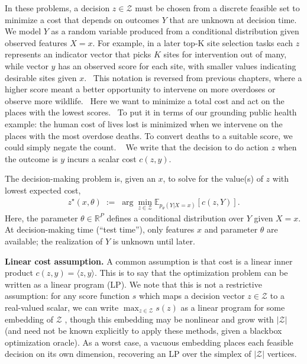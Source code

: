 In these problems, a decision $z\in\mathcal{Z}$ must be chosen from a
discrete feasible set to minimize a cost that depends on outcomes $Y$ that are
unknown at decision time. We model $Y$ as a random variable produced from a
conditional distribution given observed features $X=x$. 
For example, in a later top-K site selection tasks each $z$ represents an indicator vector that picks $K$ sites for intervention out of many, while vector $y$ has an observed score for each site, with smaller values indicating desirable sites given $x$. \
This notation is reversed from previous chapters, where a higher score meant a better opportunity to intervene on more overdoses or observe more wildlife. \
Here we want to minimize a total cost and act on the places with the lowest scores. \
To put it in terms of our grounding public health example: the human cost of lives lost is minimized when we intervene on the places with the most overdose deaths. To convert deaths to a suitable score, we could simply negate the count. \
We write that  the decision to do action $z$ when the outcome is $y$ incurs a scalar cost $c(z,y)$. 

The decision-making problem is, given an $x$, to solve for the value(s) of $z$ with lowest expected cost,\begin{align}
z^\star(x,\theta)\;:=\;\arg\min_{z\in\mathcal{Z}} \mathbb{E}_{p_{\theta}(Y | X=x)} \!\left[c(z,Y) \right].
\label{eq:decisions}
\end{align}
Here, the parameter $\theta \in \mathbb{R}^P$ defines a conditional distribution over $Y$ given $X{=}x$.
At decision-making time (``test time''), only features $x$ and parameter $\theta$ are available; the realization of $Y$ is
unknown until later.

\textbf{Linear cost assumption.} A common assumption \citep{berthetLearningDifferentiablePerturbed2020, elmachtoubSmartPredictThen2022, huang2024decisionfocusedPG} is that cost is a linear inner product $c(z, y) = 
\langle z, y\rangle$. This is to say that the optimization problem can be written as a linear program (LP).
We note that this is not a restrictive assumption: for any score function $s$ which maps a decision vector $z \in \mathcal{Z}$ to a real-valued scalar, we can write $\max_{z \in \mathcal{Z}} s(z)$ as a linear program for some embedding of $\mathcal{Z}$ \citep{berthetLearningDifferentiablePerturbed2020}, though this embedding may be nonlinear and grow with $|\mathcal{Z}|$ (and need not be known explicitly to apply these methods, given a blackbox optimization oracle). As a worst case, a vacuous embedding places each feasible decision on its own dimension, recovering an LP over the simplex of $|\mathcal{Z}|$ vertices.

